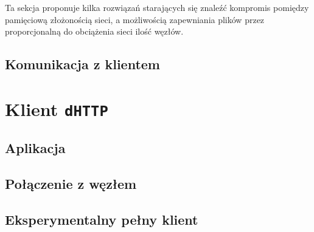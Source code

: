 Ta sekcja proponuje kilka rozwiązań starających się znaleźć kompromis pomiędzy pamięciową złożonością sieci, a możliwością zapewniania plików przez proporcjonalną do obciążenia sieci ilość węzłów.




\subsection{Komunikacja z klientem}




\section{Klient \texttt{dHTTP}}
\subsection{Aplikacja}
\subsection{Połączenie z węzłem}
\subsection{Eksperymentalny pełny klient}




